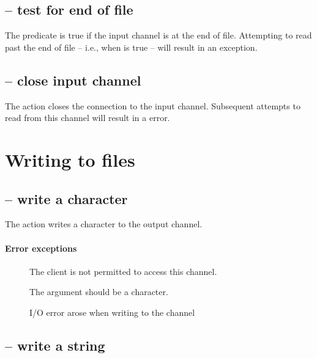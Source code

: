 \subsection{ -- test for end of file}
\label{io:eof}


The  predicate is true if the input channel is at the end of file. Attempting to read past the end of file -- i.e., when  is true -- will result in an  exception.

\subsection{ -- close input channel}
\label{io:inclose}


The  action closes the connection to the input channel.  Subsequent attempts to read from this channel will result in a  error.


\section{Writing to files}
\label{io:writing}

\subsection{ -- write a character}
\label{io:outCh}


The  action writes a character to the output channel.

\paragraph{Error exceptions}
\begin{description}
\item[]
The client is not permitted to access this channel.
\item[]
The  argument should be a character.
\item[]
I/O error arose when writing to the channel
\end{description}

\subsection{ -- write a string}
\label{io:outStr}

